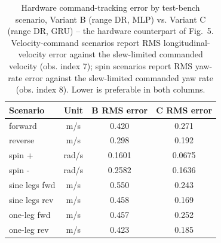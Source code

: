 \begin{table}[H]
\caption{Hardware command-tracking error by test-bench scenario, Variant B (range DR, MLP) vs. Variant C (range DR, GRU) -- the hardware counterpart of Fig.~5. Velocity-command scenarios report RMS longitudinal-velocity error against the slew-limited commanded velocity (obs. index 7); spin scenarios report RMS yaw-rate error against the slew-limited commanded yaw rate (obs. index 8). Lower is preferable in both columns.}
\begin{tabularx}{\textwidth}{Xccc}
\toprule
Scenario & Unit & B RMS error & C RMS error \\
\midrule
forward & m/s & 0.420 & 0.271 \\
reverse & m/s & 0.298 & 0.192 \\
spin + & rad/s & 0.1601 & 0.0675 \\
spin - & rad/s & 0.2582 & 0.1636 \\
sine legs fwd & m/s & 0.550 & 0.243 \\
sine legs rev & m/s & 0.458 & 0.169 \\
one-leg fwd & m/s & 0.457 & 0.252 \\
one-leg rev & m/s & 0.423 & 0.185 \\
\bottomrule
\end{tabularx}
\label{tab:hw-tracking-by-scenario}
\end{table}
